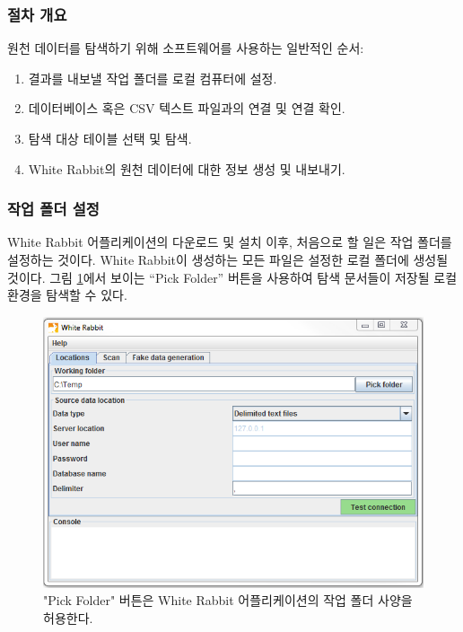\documentclass[11pt]{book}
\providecommand{\tightlist}{%
  \setlength{\itemsep}{0pt}\setlength{\parskip}{0pt}}
\theoremstyle{definition}
\theoremstyle{definition}
\theoremstyle{definition}
\theoremstyle{remark}
\begin{document}
\subsubsection*{절차 개요}\label{-}

원천 데이터를 탐색하기 위해 소프트웨어를 사용하는 일반적인 순서:

\begin{enumerate}
\def\labelenumi{\arabic{enumi}.}
\tightlist
\item
  결과를 내보낼 작업 폴더를 로컬 컴퓨터에 설정.
\item
  데이터베이스 혹은 CSV 텍스트 파일과의 연결 및 연결 확인.
\item
  탐색 대상 테이블 선택 및 탐색.
\item
  White Rabbit의 원천 데이터에 대한 정보 생성 및 내보내기.
\end{enumerate}

\subsubsection*{작업 폴더 설정}\label{--}

White Rabbit 어플리케이션의 다운로드 및 설치 이후, 처음으로 할 일은 작업
폴더를 설정하는 것이다. White Rabbit이 생성하는 모든 파일은 설정한 로컬
폴더에 생성될 것이다. 그림 \ref{fig:WhiteRabbitLocation}에서 보이는
``Pick Folder'' 버튼을 사용하여 탐색 문서들이 저장될 로컬 환경을 탐색할
수 있다.

\begin{figure}

{\centering \includegraphics[width=1\linewidth]{images/ExtractTransformLoad/WhiteRabbitLocation} 

}

\caption{"Pick Folder" 버튼은 White Rabbit 어플리케이션의 작업 폴더 사양을 허용한다.}\label{fig:WhiteRabbitLocation}
\end{figure}
\end{document}
